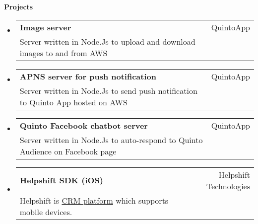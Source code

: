 \documentclass[letterpaper,11pt]{article}
\makeatletter
\newcommand{\resheading}[1]{{\large \colorbox{mygrey}{\begin{minipage}{\textwidth}{\textbf{#1 \vphantom{p\^{E}}}}\end{minipage}}}}
\newcommand{\ressubheading}[3]{
	\begin{tabular*}{6.5in}{l@{\extracolsep{\fill}}r}
			\textbf{#1} & #2\\
			{#3} \\
	\end{tabular*}\vspace{-6pt}
}
\makeatother
\begin{document}
\resheading{Projects}
	\begin{itemize}
		\item 
			\ressubheading{Image server}{QuintoApp}{Server written in Node.Js to upload and download images to and from AWS}
		\item
			\ressubheading{APNS server for push notification}{QuintoApp}{Server written in Node.Js to send push notification to Quinto App hosted on AWS}
		\item
			\ressubheading{Quinto Facebook chatbot server}{QuintoApp}{Server written in Node.Js to auto-respond to Quinto Audience on Facebook page}	
		\item
			\ressubheading{Helpshift SDK (iOS)}{Helpshift Technologies}{Helpshift is \href{https://en.wikipedia.org/wiki/Customer_relationship_management}{CRM platform} which supports mobile devices.}
 


\end{itemize}
\end{document}
